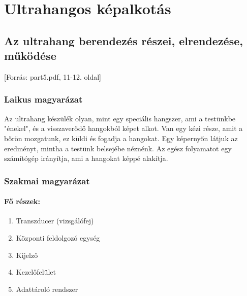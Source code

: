 \documentclass[a4paper,12pt]{article}
\begin{document}
\newpage

\section{Ultrahangos képalkotás}

\subsection{Az ultrahang berendezés részei, elrendezése, működése} [Forrás: part5.pdf, 11-12. oldal]

\subsubsection{Laikus magyarázat} Az ultrahang készülék olyan, mint egy speciális hangszer, ami a testünkbe "énekel", és a visszaverődő hangokból képet alkot. Van egy kézi része, amit a bőrön mozgatunk, ez küldi és fogadja a hangokat. Egy képernyőn látjuk az eredményt, mintha a testünk belsejébe néznénk. Az egész folyamatot egy számítógép irányítja, ami a hangokat képpé alakítja.

\subsubsection{Szakmai magyarázat}

\paragraph{Fő részek:} \begin{enumerate} \item Transzducer (vizsgálófej) \item Központi feldolgozó egység \item Kijelző \item Kezelőfelület \item Adattároló rendszer \end{enumerate}
\end{document}
